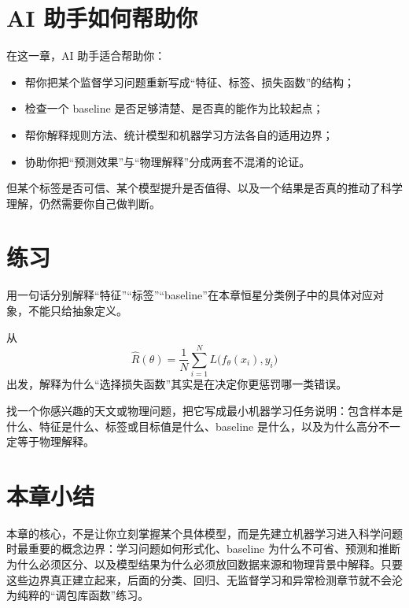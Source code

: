 \section{AI 助手如何帮助你}

在这一章，AI 助手适合帮助你：

\begin{itemize}
    \item 帮你把某个监督学习问题重新写成“特征、标签、损失函数”的结构；
    \item 检查一个 baseline 是否足够清楚、是否真的能作为比较起点；
    \item 帮你解释规则方法、统计模型和机器学习方法各自的适用边界；
    \item 协助你把“预测效果”与“物理解释”分成两套不混淆的论证。
\end{itemize}

但某个标签是否可信、某个模型提升是否值得、以及一个结果是否真的推动了科学理解，仍然需要你自己做判断。

\section{练习}

\begin{exercisebox}[基础练习]
用一句话分别解释“特征”“标签”“baseline”在本章恒星分类例子中的具体对应对象，不能只给抽象定义。
\end{exercisebox}

\begin{exercisebox}[进阶练习]
从
\[
\hat{R}(\theta) = \frac{1}{N}\sum_{i=1}^{N} L\bigl(f_\theta(x_i), y_i\bigr)
\]
出发，解释为什么“选择损失函数”其实是在决定你更惩罚哪一类错误。
\end{exercisebox}

\begin{exercisebox}[开放练习]
找一个你感兴趣的天文或物理问题，把它写成最小机器学习任务说明：包含样本是什么、特征是什么、标签或目标值是什么、baseline 是什么，以及为什么高分不一定等于物理解释。
\end{exercisebox}

\section{本章小结}

本章的核心，不是让你立刻掌握某个具体模型，而是先建立机器学习进入科学问题时最重要的概念边界：学习问题如何形式化、baseline 为什么不可省、预测和推断为什么必须区分、以及模型结果为什么必须放回数据来源和物理背景中解释。只要这些边界真正建立起来，后面的分类、回归、无监督学习和异常检测章节就不会沦为纯粹的“调包库函数”练习。
